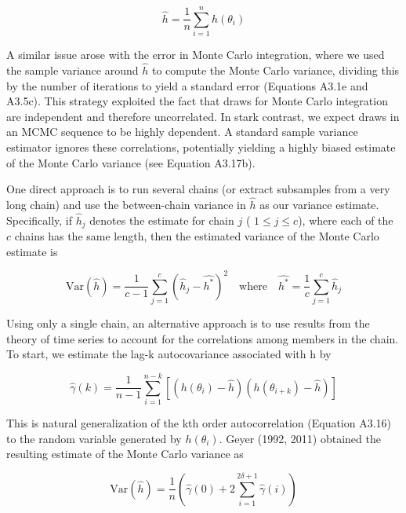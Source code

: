 \documentclass{article}
\begin{document}
\begin{equation}
\widehat{h}=\frac{1}{n}\sum_{i=1}^{n}h(\theta_{i})
\end{equation}

A similar issue arose with the error in Monte Carlo integration, where we used the sample variance around  $ \hat{h} $ to compute the Monte Carlo variance, dividing this by the number of iterations to yield a standard error (Equations A3.1e and A3.5c). This strategy exploited the fact that draws for Monte Carlo integration are independent and therefore uncorrelated. In stark contrast, we expect draws in an MCMC sequence to be highly dependent. A standard sample variance estimator ignores these correlations, potentially yielding a highly biased estimate of the Monte Carlo variance (see Equation A3.17b).

One direct approach is to run several chains (or extract subsamples from a very long chain) and use the between-chain variance in  $ \widehat{h} $ as our variance estimate. Specifically, if  $ \widehat{h}_j $ denotes the estimate for chain  $ j $ ( $ 1 \leq j \leq c $), where each of the  $ c $ chains has the same length, then the estimated variance of the Monte Carlo estimate is

\begin{equation}
\mathrm{Var}\left(\widehat{h}\right)=\frac{1}{c-1}\sum_{j=1}^{c}\left(\widehat{h}_{j}-\widehat{h^{*}}\right)^{2}\quad\mathrm{w h e r e}\quad\widehat{h^{*}}=\frac{1}{c}\sum_{j=1}^{c}\widehat{h}_{j}
\end{equation}

Using only a single chain, an alternative approach is to use results from the theory of time series to account for the correlations among members in the chain. To start, we estimate the lag-k autocovariance associated with h by

\begin{equation}
\widehat{\gamma}(k)=\frac{1}{n-1}\sum_{i=1}^{n-k}\left[\left(h(\theta_{i})-\widehat{h}\right)\left(h(\theta_{i+k})-\widehat{h}\right)\right]
\end{equation}

This is natural generalization of the kth order autocorrelation (Equation A3.16) to the random variable generated by  $ h(\theta_{i}) $. Geyer (1992, 2011) obtained the resulting estimate of the Monte Carlo variance as

\begin{equation}
\mathrm{Var}\left(\widehat{h}\right)=\frac{1}{n}\left(\widehat{\gamma}(0)+2\sum_{i=1}^{2\delta+1}\widehat{\gamma}(i)\right)
\end{equation}
\end{document}
